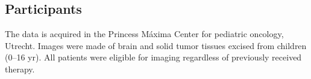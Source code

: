 \subsection{Participants}

The data is acquired in the Princess Máxima Center for pediatric oncology, Utrecht.
Images were made of brain and solid tumor tissues excised from children (0--16 yr).
All patients were eligible for imaging regardless of previously received therapy.
